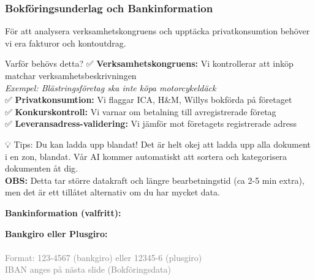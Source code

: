 \documentclass[10pt]{beamer}
\begin{document}
\begin{frame}[label=bokforingsunderlag]
  \frametitle{Bokföringsunderlag och Bankinformation}
  \small
  För att analysera verksamhetskongruens och upptäcka privatkonsumtion behöver vi era fakturor och kontoutdrag.
  
  \vspace{0.3cm}
  \begin{block}{Varför behövs detta?}
    \footnotesize
    ✅ \textbf{Verksamhetskongruens:} Vi kontrollerar att inköp matchar verksamhetsbeskrivningen\\
    \hspace{0.5cm}\textit{Exempel: Blästringsföretag ska inte köpa motorcykeldäck}\\
    ✅ \textbf{Privatkonsumtion:} Vi flaggar ICA, H\&M, Willys bokförda på företaget\\
    ✅ \textbf{Konkurskontroll:} Vi varnar om betalning till avregistrerade företag\\
    ✅ \textbf{Leveransadress-validering:} Vi jämför mot företagets registrerade adress
  \end{block}
  
  \vspace{0.3cm}
  \begin{block}{💡 Tips: Du kan ladda upp blandat!}
    \footnotesize
    Det är helt okej att ladda upp alla dokument i en zon, blandat. Vår AI kommer automatiskt att sortera och kategorisera dokumenten åt dig.\\
    \textbf{OBS:} Detta tar större datakraft och längre bearbetningstid (ca 2-5 min extra), men det är ett tillåtet alternativ om du har mycket data.
  \end{block}
  
  \vspace{0.3cm}
  \textbf{Bankinformation (valfritt):}\\
  \vspace{0.2cm}
  \begin{minipage}{0.48\textwidth}
    \footnotesize
    \textbf{Bankgiro eller Plusgiro:}\\
    \fbox{\rule{4.5cm}{0.5cm}}\\
    \tiny\textcolor{gray}{Format: 123-4567 (bankgiro) eller 12345-6 (plusgiro)}\\
    \tiny\textcolor{gray}{IBAN anges på nästa slide (Bokföringsdata)}
  \end{minipage}
  

\end{frame}
\end{document}
